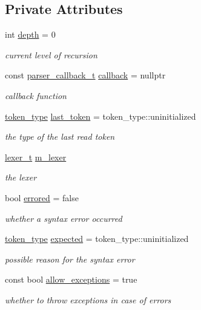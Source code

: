 \subsection*{Private Attributes}
\begin{DoxyCompactItemize}
\item 
int \hyperlink{classnlohmann_1_1detail_1_1parser_a49dca6af052e9cab3a48dc1eaa163063}{depth} = 0
\begin{DoxyCompactList}\small\item\em current level of recursion \end{DoxyCompactList}\item 
const \hyperlink{classnlohmann_1_1detail_1_1parser_ad250ad4f2b4af4a497e727c963162ff1}{parser\+\_\+callback\+\_\+t} \hyperlink{classnlohmann_1_1detail_1_1parser_a7600d272ec605e3ffdc8512b3585f476}{callback} = nullptr
\begin{DoxyCompactList}\small\item\em callback function \end{DoxyCompactList}\item 
\hyperlink{classnlohmann_1_1detail_1_1parser_a21d247111b332785b7acf3f8e487d117}{token\+\_\+type} \hyperlink{classnlohmann_1_1detail_1_1parser_a932e49f6f4d291557846744319245994}{last\+\_\+token} = token\+\_\+type\+::uninitialized
\begin{DoxyCompactList}\small\item\em the type of the last read token \end{DoxyCompactList}\item 
\hyperlink{classnlohmann_1_1detail_1_1parser_a16030c5af158a94d1c799f82ff3a0147}{lexer\+\_\+t} \hyperlink{classnlohmann_1_1detail_1_1parser_a22dcc815551a4052b87797b34171b352}{m\+\_\+lexer}
\begin{DoxyCompactList}\small\item\em the lexer \end{DoxyCompactList}\item 
bool \hyperlink{classnlohmann_1_1detail_1_1parser_af6a116454a868ebb6628c6137c3dd77d}{errored} = false
\begin{DoxyCompactList}\small\item\em whether a syntax error occurred \end{DoxyCompactList}\item 
\hyperlink{classnlohmann_1_1detail_1_1parser_a21d247111b332785b7acf3f8e487d117}{token\+\_\+type} \hyperlink{classnlohmann_1_1detail_1_1parser_ad055620d886819b26dabc1dfb80c7fb7}{expected} = token\+\_\+type\+::uninitialized
\begin{DoxyCompactList}\small\item\em possible reason for the syntax error \end{DoxyCompactList}\item 
const bool \hyperlink{classnlohmann_1_1detail_1_1parser_a3de1ea054cfa606e79fa07741f081b5f}{allow\+\_\+exceptions} = true
\begin{DoxyCompactList}\small\item\em whether to throw exceptions in case of errors \end{DoxyCompactList}\end{DoxyCompactItemize}


